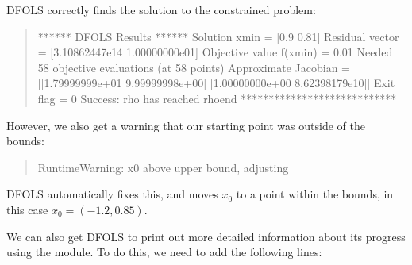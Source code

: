 \documentclass[letterpaper,10pt,english]{sphinxmanual}
\begin{document}
\sphinxAtStartPar
DFO\sphinxhyphen{}LS correctly finds the solution to the constrained problem:
\begin{quote}

\begin{sphinxVerbatim}[commandchars=\\\{\}]
****** DFO\PYGZhy{}LS Results ******
Solution xmin = [0.9  0.81]
Residual vector = [3.10862447e\PYGZhy{}14 1.00000000e\PYGZhy{}01]
Objective value f(xmin) = 0.01
Needed 58 objective evaluations (at 58 points)
Approximate Jacobian = [[\PYGZhy{}1.79999999e+01  9.99999998e+00]
 [\PYGZhy{}1.00000000e+00  8.62398179e\PYGZhy{}10]]
Exit flag = 0
Success: rho has reached rhoend
****************************
\end{sphinxVerbatim}
\end{quote}

\sphinxAtStartPar
However, we also get a warning that our starting point was outside of the bounds:
\begin{quote}

\begin{sphinxVerbatim}[commandchars=\\\{\}]
RuntimeWarning: x0 above upper bound, adjusting
\end{sphinxVerbatim}
\end{quote}

\sphinxAtStartPar
DFO\sphinxhyphen{}LS automatically fixes this, and moves \(x_0\) to a point within the bounds, in this case \(x_0=(-1.2,0.85)\).

\sphinxAtStartPar
We can also get DFO\sphinxhyphen{}LS to print out more detailed information about its progress using the  module. To do this, we need to add the following lines:
\begin{quote}

\begin{sphinxVerbatim}[commandchars=\\\{\}]
 
 

\end{sphinxVerbatim}
\end{quote}
\end{document}
